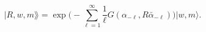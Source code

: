 \begin{equation}
\label{eq:Ishi}
  \lvert R,w,m \rAngle = \exp \bigl (-\sum_{\ell=1}^\infty
  \frac{1}{\ell} G(\alpha_{-\ell}, R \bar{\alpha}_{-\ell} ) \bigr )
  \lvert w,m \rangle.
\end{equation}

